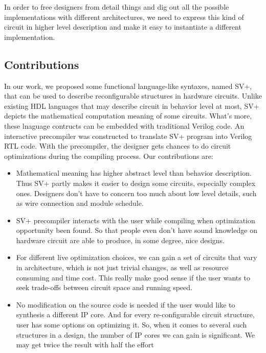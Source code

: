 In order to free designers from detail things and dig out all the possible implementations with different architectures, we need to express this kind of circuit in higher level description and make it easy to instantiate a different implementation.

\subsection{Contributions}
In our work, we proposed some functional language-like syntaxes, named SV+, that can be used to describe reconfigurable structures in hardware circuits. Unlike existing HDL languages that may describe circuit in behavior level at most, SV+ depicts the mathematical computation meaning of some circuits. What's more, these lnaguage contructs can be embedded with traditional Verilog code. An interactive precompiler was constructed to translate SV+ program into Verilog RTL code. With the precompiler, the designer gets chances to do circuit optimizations during the compiling process. Our contributions are:

\begin{itemize}
    \item Mathematical meaning has higher abstract level than behavior description.
          Thus SV+ partly makes it easier to design some circuits, especially
          complex ones. Designers don't have to concern too much about low level details, such as
          wire connection and module schedule.
    \item SV+ precompiler interacts with the user while compiling when optimization opportunity
          been found. So that people even don't have sound knowledge on hardware circuit are
          able to produce, in some degree, nice designs.
    \item For different live optimization choices, we can gain a set of circuits that vary in
          architecture, which is not just trivial changes, as well as resource consuming and
          time cost. This really make good sense if the user wants to seek trade-offs between
          circuit space and running speed.
    \item No modification on the source code is needed if the user would like to synthesis a
          different IP core. And for every re-configurable circuit structure, user has some
          options on optimizing it. So, when it comes to several such structures in a design, the number
          of IP cores we can gain is significant. We may get twice the result with half the effort
\end{itemize}
